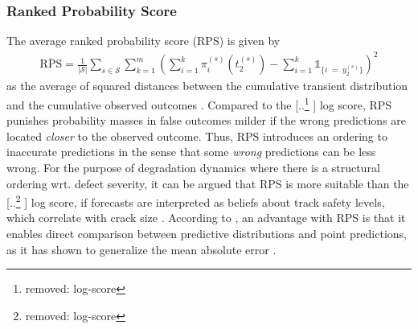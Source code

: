 \documentclass{article}
\providecommand{\DIFadd}[1]{{\protect\color{blue} \sf #1}} %
\providecommand{\DIFdel}[1]{{\protect\color{red} [..\footnote{removed: #1} ]}} %
\providecommand{\DIFaddbegin}{} %
\providecommand{\DIFaddend}{} %
\providecommand{\DIFdelbegin}{} %
\providecommand{\DIFdelend}{} %
\begin{document}
\subsubsection{Ranked Probability Score}
The average ranked probability score (RPS) is given by
\DIFdelbegin %
\DIFdelend \DIFaddbegin \begin{align}
    \overline{\text{RPS}} =\frac{1}{\vert \mathcal{S} \vert} \sum_{s \in \mathcal{S}} \sum_{k = 1}^m\left( \sum_{i = 1}^k \pi^{(s)}_i\left( t_2^{(s)} \right)  - \sum_{i = 1}^k\mathds{1}_{ \{ i \; = \; y_2^{(s)} \} } \right)^2 \label{eq:RPS}
\end{align}\DIFaddend 
as the average of squared distances between the cumulative transient distribution and the cumulative observed outcomes \citep{Epstein1969}.
Compared to the \DIFdelbegin \DIFdel{log-score}\DIFdelend \DIFaddbegin \DIFadd{log score}\DIFaddend , RPS punishes probability masses in false outcomes milder if the wrong predictions are located \textit{closer} to the observed outcome. Thus, RPS introduces an ordering to inaccurate predictions in the sense that some \textit{wrong} predictions can be less wrong.
For the purpose of degradation dynamics where there is a structural ordering wrt. defect severity, it can be argued that RPS is more suitable than the \DIFdelbegin \DIFdel{log-score}\DIFdelend \DIFaddbegin \DIFadd{log score}\DIFaddend , if forecasts are interpreted as beliefs about track 
safety levels, which correlate with crack size \citep{UIC_2002_defecthandbook}. 
According to \citet{Czado2009}, an advantage with RPS is that it enables direct comparison between predictive distributions and point predictions, as it has shown to generalize the mean absolute error \citep{Hersbach2000}.
\end{document}
